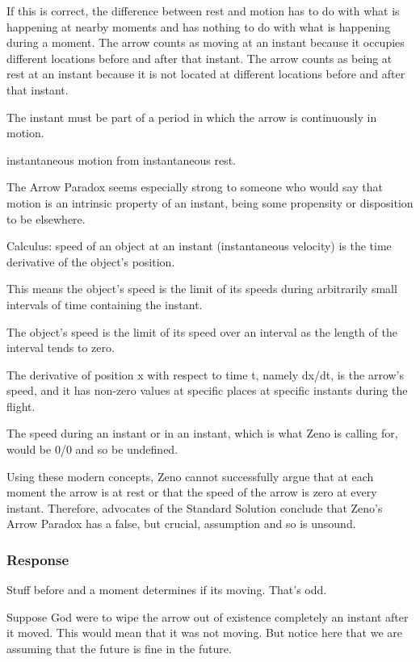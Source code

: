 \documentclass[]{article}
\begin{document}
If this is correct, the difference between rest and motion has to do
with what is happening at nearby moments and has nothing to do with what
is happening during a moment. The arrow counts as moving at an instant
because it occupies different locations before and after that instant.
The arrow counts as being at rest at an instant because it is not
located at different locations before and after that instant.

The instant must be part of a period in which the arrow is continuously
in motion.

instantaneous motion from instantaneous rest.

The Arrow Paradox seems especially strong to someone who would say that
motion is an intrinsic property of an instant, being some propensity or
disposition to be elsewhere.

Calculus: speed of an object at an instant (instantaneous velocity) is
the time derivative of the object's position.

This means the object's speed is the limit of its speeds during
arbitrarily small intervals of time containing the instant.

The object's speed is the limit of its speed over an interval as the
length of the interval tends to zero.

The derivative of position x with respect to time t, namely dx/dt, is
the arrow's speed, and it has non-zero values at specific places at
specific instants during the flight.

The speed during an instant or in an instant, which is what Zeno is
calling for, would be 0/0 and so be undefined.

Using these modern concepts, Zeno cannot successfully argue that at each
moment the arrow is at rest or that the speed of the arrow is zero at
every instant. Therefore, advocates of the Standard Solution conclude
that Zeno's Arrow Paradox has a false, but crucial, assumption and so is
unsound.

\subsubsection{Response}\label{response}

Stuff before and a moment determines if its moving. That's odd.

Suppose God were to wipe the arrow out of existence completely an
instant after it moved. This would mean that it was not moving. But
notice here that we are assuming that the future is fine in the future.
\end{document}
